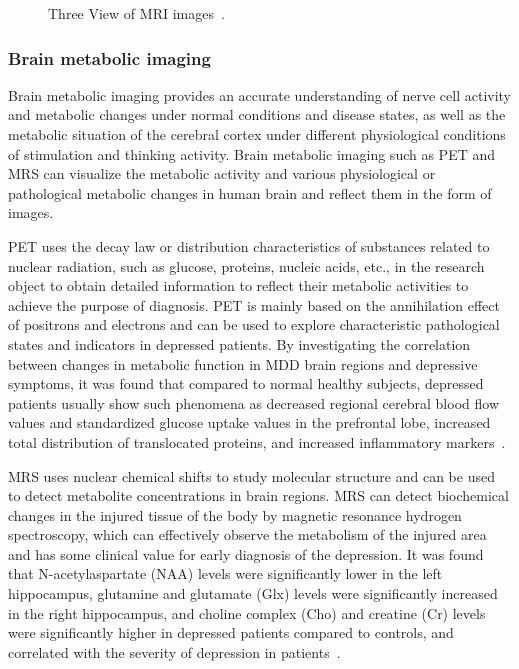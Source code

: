 \begin{figure}[tbp]
\centering
	
	\caption{
	Three View of MRI images~\cite{marek2011parkinson}.
	}
	\label{MRI}
\end{figure}

\subsubsection{Brain metabolic imaging}
Brain metabolic imaging provides an accurate understanding of nerve cell activity and metabolic changes under normal conditions and disease states, as well as the metabolic situation of the cerebral cortex under different physiological conditions of stimulation and thinking activity. Brain metabolic imaging such as PET and MRS can visualize the metabolic activity and various physiological or pathological metabolic changes in human brain and reflect them in the form of images.

PET uses the decay law or distribution characteristics of substances related to nuclear radiation, such as glucose, proteins, nucleic acids, etc., in the research object to obtain detailed information to reflect their metabolic activities to achieve the purpose of diagnosis.
PET is mainly based on the annihilation effect of positrons and electrons and can be used to explore characteristic pathological states and indicators in depressed patients. By investigating the correlation between changes in metabolic function in MDD brain regions and depressive symptoms, it was found that compared to normal healthy subjects, depressed patients usually show such phenomena as decreased regional cerebral blood flow values and standardized glucose uptake values in the prefrontal lobe, increased total distribution of translocated proteins, and increased inflammatory markers~\cite{2017Functional,2017Elevated,li2018microglial,2014Cerebral}.

MRS uses nuclear chemical shifts to study molecular structure and can be used to detect metabolite concentrations in brain regions.
MRS can detect biochemical changes in the injured tissue of the body by magnetic resonance hydrogen spectroscopy, which can effectively observe the metabolism of the injured area and has some clinical value for early diagnosis of the depression.
It was found that N-acetylaspartate (NAA) levels were significantly lower in the left hippocampus, glutamine and glutamate (Glx) levels were significantly increased in the right hippocampus, and choline complex (Cho) and creatine (Cr) levels were significantly higher in depressed patients compared to controls, and correlated with the severity of depression in patients~\cite{2018Early,20181H,2013}.


